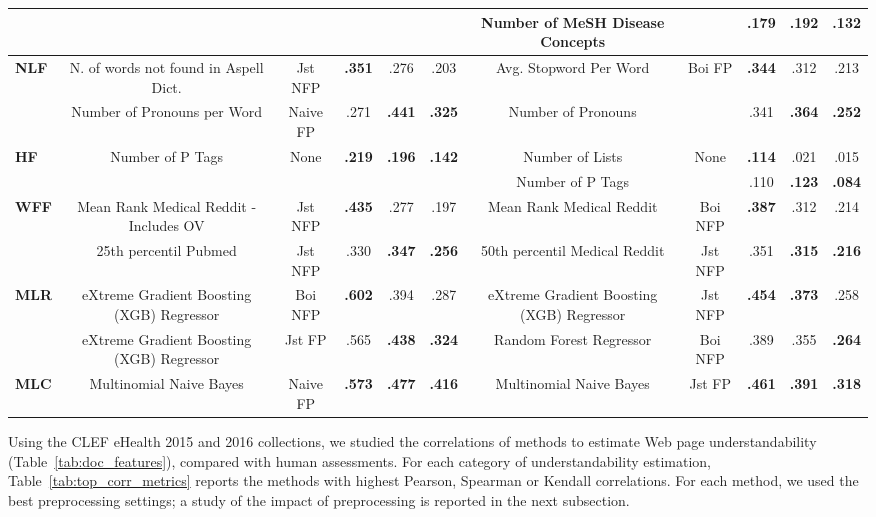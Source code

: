 \documentclass[10pt,a4paper]{article}
\begin{document}
\begin{table}[t]
{\begin{tabular}{l|ccccc||ccccc}
			&  &  &  &  &  & Number of MeSH Disease Concepts  &  & .179  & \textbf{.192}  & \textbf{.132}\tabularnewline
			\midrule 
			\multirow{2}{*}{\textbf{NLF}} & N. of words not found in Aspell Dict.  & Jst NFP  & \textbf{.351}  & .276  & .203 & Avg. Stopword Per Word  & \multirow{2}{*}{Boi FP } & \textbf{.344}  & .312  & .213\tabularnewline
			& Number of Pronouns per Word  & Naive FP  & .271  & \textbf{.441}  & \textbf{.325} & Number of Pronouns  &  & .341  & \textbf{.364}  & \textbf{.252}\tabularnewline
			\midrule 
			\multirow{2}{*}{\textbf{HF}} & \multirow{2}{*}{Number of P Tags } & \multirow{2}{*}{None } & \multirow{2}{*}{\textbf{.219} } & \multirow{2}{*}{\textbf{.196} } & \multirow{2}{*}{\textbf{.142}} & Number of Lists  & \multirow{2}{*}{None} & \textbf{.114}  & .021  & .015\tabularnewline
			&  &  &  &  &  & Number of P Tags  &  & .110  & \textbf{.123}  & \textbf{.084}\tabularnewline
			\midrule 
            \multirow{2}{*}{\textbf{WFF}} & Mean Rank Medical Reddit - Includes OV  & Jst NFP  & \textbf{.435}  & .277  & .197 & Mean Rank Medical Reddit  & Boi NFP  & \textbf{.387}  & .312  & .214\tabularnewline
			& 25th percentil Pubmed  & Jst NFP  & .330  & \textbf{.347}  & \textbf{.256} & 50th percentil Medical Reddit  & Jst NFP  & .351  & \textbf{.315}  & \textbf{.216}\tabularnewline
			\midrule 
			\multirow{2}{*}{\textbf{MLR}} & eXtreme Gradient Boosting (XGB) Regressor  & Boi NFP  & \textbf{.602}  & .394  & .287 & eXtreme Gradient Boosting (XGB) Regressor  & Jst NFP  & \textbf{.454}  & \textbf{.373}  & .258\tabularnewline
			& eXtreme Gradient Boosting (XGB) Regressor  & Jst FP  & .565  & \textbf{.438}  & \textbf{.324} & Random Forest Regressor  & Boi NFP  & .389  & .355  & \textbf{.264}\tabularnewline
			\midrule 
			\textbf{MLC} & Multinomial Naive Bayes  & Naive FP  & \textbf{.573}  & \textbf{.477}  & \textbf{.416} & Multinomial Naive Bayes  & Jst FP  & \textbf{.461}  & \textbf{.391}  & \textbf{.318}\tabularnewline
			\bottomrule
		\end{tabular}
	} %
\end{table}


Using the CLEF eHealth 2015 and 2016 collections, we studied the correlations of methods to estimate Web page understandability (Table~\ref{tab:doc_features}), compared with human assessments. For each category of understandability estimation, Table~\ref{tab:top_corr_metrics} reports the methods with highest Pearson, Spearman or Kendall correlations. For each method, we used the best preprocessing settings; a study of the impact of preprocessing is reported in the next subsection.
\end{document}
